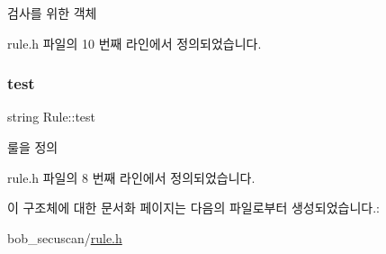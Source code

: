 검사를 위한 객체 

rule.\+h 파일의 10 번째 라인에서 정의되었습니다.

\mbox{\label{struct_rule_abbeb0189b257493fd9d06c8c7c85ba58}} 
\subsubsection{\texorpdfstring{test}{test}}
{\footnotesize\ttfamily string Rule\+::test}

룰을 정의 

rule.\+h 파일의 8 번째 라인에서 정의되었습니다.



이 구조체에 대한 문서화 페이지는 다음의 파일로부터 생성되었습니다.\+:\begin{DoxyCompactItemize}
\item 
bob\+\_\+secuscan/\hyperlink{rule_8h}{rule.\+h}\end{DoxyCompactItemize}
